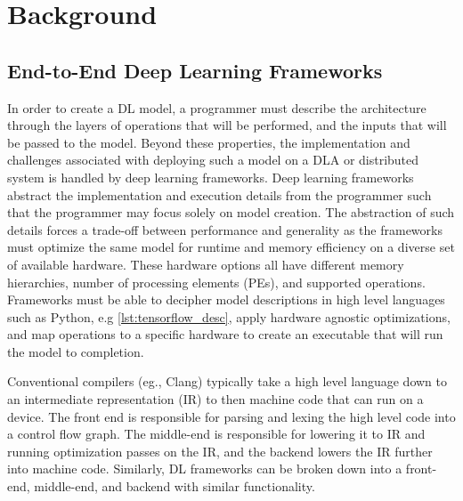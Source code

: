 
\chapter{Background} %

\label{Chapter2} %

\section{End-to-End Deep Learning Frameworks}

In order to create a DL model, a programmer must describe the architecture
through the layers of operations that will be performed, and the inputs that
will be passed to the model. Beyond these properties, the implementation and
challenges associated with deploying such a model on a DLA or distributed
system is handled by deep learning frameworks. Deep learning frameworks
abstract the implementation and execution details from the programmer such that
the programmer may focus solely on model creation. The abstraction of such
details forces a trade-off between performance and generality as the frameworks
must optimize the same model for runtime and memory efficiency on a diverse set
of available hardware. These hardware options all have different memory hierarchies, number of
processing elements (PEs),
and supported operations. Frameworks must be able to decipher model
descriptions in high level languages such as Python, e.g \ref{lst:tensorflow_desc},
apply hardware agnostic optimizations, and map operations to a specific
hardware to create an executable that will run the model to completion.

Conventional compilers (eg., Clang) typically take a high level language down to
an intermediate representation (IR) to then machine code that can run on a
device.  The front end is responsible for parsing and lexing the high level
code into a control flow graph. The middle-end is responsible for lowering it
to IR and running optimization passes on the IR, and the backend lowers the IR
further into machine code. Similarly, DL frameworks can be broken down into a
front-end, middle-end, and backend with similar functionality.

